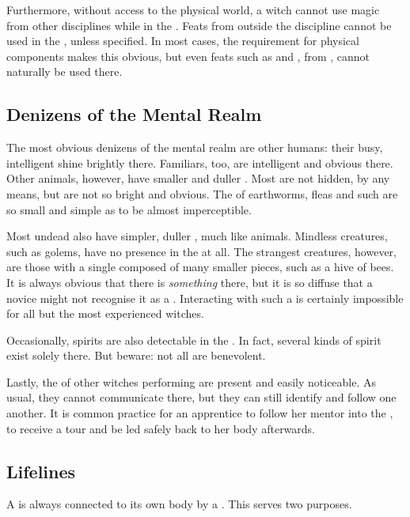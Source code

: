 Furthermore, without access to the physical world, a witch cannot use magic from other disciplines while in the {\mentalrealm}.
Feats from outside the  discipline cannot be used in the {\mentalrealm}, unless specified.
In most cases, the requirement for physical components makes this obvious, but even feats such as  and , from , cannot naturally be used there.

\subsection{Denizens of the Mental Realm}

The most obvious denizens of the mental realm are other humans: their busy, intelligent {\minds} shine brightly there.
Familiars, too, are intelligent and obvious there.
Other animals, however, have smaller and duller {\minds}.
Most are not hidden, by any means, but are not so bright and obvious.
The {\minds} of earthworms, fleas and such are so small and simple as to be almost imperceptible.

Most undead also have simpler, duller {\minds}, much like animals.
Mindless creatures, such as golems, have no presence in the {\mentalrealm} at all.
The strangest creatures, however, are those with a single {\mind} composed of many smaller pieces, such as a hive of bees.
It is always obvious that there is \emph{something} there, but it is so diffuse that a novice might not recognise it as a {\mind}.
Interacting with such a {\mind} is certainly impossible for all but the most experienced witches.

Occasionally, spirits are also detectable in the {\mentalrealm}.
In fact, several kinds of spirit exist solely there.
But beware: not all are benevolent.

Lastly, the {\minds} of other witches performing  are present and easily noticeable.
As usual, they cannot communicate there, but they can still identify and follow one another.
It is common practice for an apprentice to follow her mentor into the {\mentalrealm}, to receive a tour and be led safely back to her body afterwards.

\subsection{Lifelines}

A {\mind} is always connected to its own body by a {\lifeline}.
This {\lifeline} serves two purposes.

